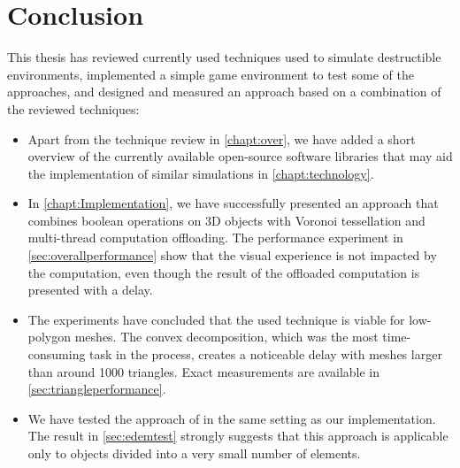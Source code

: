 \chapter*{Conclusion}

This thesis has reviewed currently used techniques used to simulate destructible environments, implemented a simple game environment to test some of the approaches, and designed and measured an approach based on a combination of the reviewed techniques:

\begin{itemize}

\item Apart from the technique review in \cref{chapt:over}, we have added a short overview of the currently available open-source software libraries that may aid the implementation of similar simulations in \cref{chapt:technology}.

\item In \cref{chapt:Implementation}, we have successfully presented an approach that combines boolean operations on 3D objects with Voronoi tessellation and multi-thread computation offloading. The performance experiment in \cref{sec:overallperformance} show that the visual experience is not impacted by the computation, even though the result of the offloaded computation is presented with a delay.


\item The experiments have concluded that the used technique is viable for low-polygon meshes. The convex decomposition, which was the most time-consuming task in the process, creates a noticeable delay with meshes larger than around 1000 triangles. Exact measurements are available in \cref{sec:triangleperformance}.


\item We have tested the approach of \citet{edem} in the same setting as our implementation. The result in \cref{sec:edemtest} strongly suggests that this approach is applicable only to objects divided into a very small number of elements.
\end{itemize}

